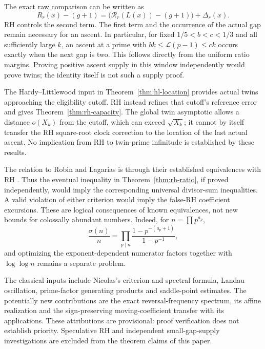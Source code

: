 \documentclass[11pt]{article}
\theoremstyle{definition}
\newcommand{\LL}{\mathcal L}
\begin{document}
The exact raw comparison can be written as
\[
 R_r(x)-(g+1)=
 \bigl(\mathcal R_r(L(x))-(g+1)\bigr)+\Delta_r(x).
\]
RH controls the second term. The first term and the occurrence of
the actual gap remain necessary for an ascent. In particular,
for fixed $1/5<b<c<1/3$ and all sufficiently large $k$, an ascent
at a prime with $bk\le\LL(p-1)\le ck$ occurs exactly when the next
gap is two. This follows directly from the uniform ratio margins.
Proving positive ascent supply in this window independently would
prove twins; the identity itself is not such a supply proof.

The Hardy--Littlewood input in Theorem~\ref{thm:hl-location}
provides actual twins approaching the eligibility cutoff.
RH instead refines that cutoff's reference error and gives
Theorem~\ref{thm:rh-capacity}. The global twin asymptotic allows
a distance $o(X_k)$ from the cutoff, which can exceed
$\sqrt{X_k}$; it cannot by itself transfer the RH square-root
clock correction to the location of the last actual ascent.
No implication from RH to twin-prime infinitude is established
by these results.

The relation to Robin and Lagarias is through their established
equivalences with RH \cite{Lagarias}. Thus the eventual inequality
in Theorem~\ref{thm:rh-ratio}, if proved independently, would imply
the corresponding universal divisor-sum inequalities. A valid
violation of either criterion would imply the false-RH coefficient
excursions. These are logical consequences of known equivalences,
not new bounds for colossally abundant numbers.
Indeed, for $n=\prod p^{a_p}$,
\[
 \frac{\sigma(n)}n=
 \prod_{p\mid n}\frac{1-p^{-(a_p+1)}}{1-p^{-1}},
\]
and optimizing the exponent-dependent numerator factors together
with $\log\log n$ remains a separate problem.

The classical inputs include Nicolas's criterion and spectral
formula, Landau oscillation, prime-factor generating products and
saddle-point estimates. The potentially new contributions are the
exact reversal-frequency spectrum, its affine realization and
the sign-preserving moving-coefficient transfer with its
applications. These attributions are provisional: proof
verification does not establish priority. Speculative RH and
independent small-gap-supply investigations are excluded from the
theorem claims of this paper.
\end{document}
